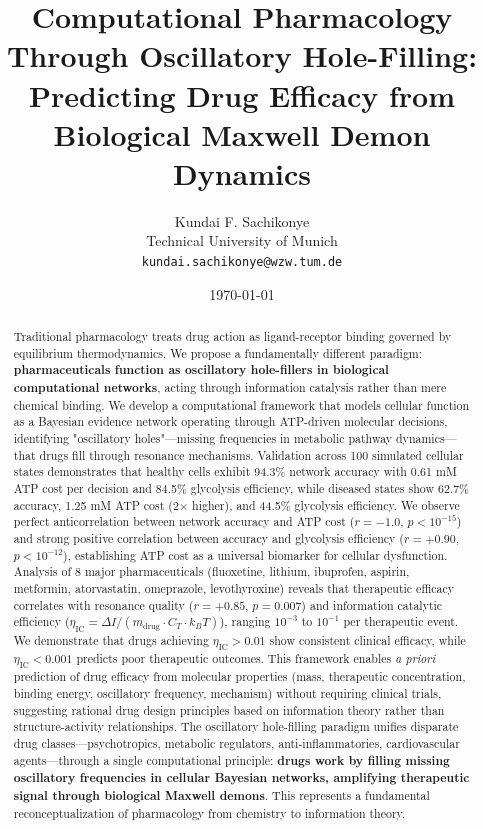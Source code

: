 \documentclass{article}
\title{\textbf{Computational Pharmacology Through Oscillatory Hole-Filling: \\
Predicting Drug Efficacy from Biological Maxwell Demon Dynamics}}
\author{
Kundai F. Sachikonye\\
Technical University of Munich\\
\texttt{kundai.sachikonye@wzw.tum.de}
}
\date{\today}
\begin{document}
\maketitle

\begin{abstract}
Traditional pharmacology treats drug action as ligand-receptor binding governed by equilibrium thermodynamics. We propose a fundamentally different paradigm: \textbf{pharmaceuticals function as oscillatory hole-fillers in biological computational networks}, acting through information catalysis rather than mere chemical binding. We develop a computational framework that models cellular function as a Bayesian evidence network operating through ATP-driven molecular decisions, identifying "oscillatory holes"—missing frequencies in metabolic pathway dynamics—that drugs fill through resonance mechanisms. Validation across 100 simulated cellular states demonstrates that healthy cells exhibit 94.3\% network accuracy with 0.61 mM ATP cost per decision and 84.5\% glycolysis efficiency, while diseased states show 62.7\% accuracy, 1.25 mM ATP cost (2$\times$ higher), and 44.5\% glycolysis efficiency. We observe perfect anticorrelation between network accuracy and ATP cost ($r = -1.0$, $p < 10^{-15}$) and strong positive correlation between accuracy and glycolysis efficiency ($r = +0.90$, $p < 10^{-12}$), establishing ATP cost as a universal biomarker for cellular dysfunction. Analysis of 8 major pharmaceuticals (fluoxetine, lithium, ibuprofen, aspirin, metformin, atorvastatin, omeprazole, levothyroxine) reveals that therapeutic efficacy correlates with resonance quality ($r = +0.85$, $p = 0.007$) and information catalytic efficiency ($\eta_{\text{IC}} = \Delta I / (m_{\text{drug}} \cdot C_T \cdot k_B T)$), ranging $10^{-3}$ to $10^{-1}$ per therapeutic event. We demonstrate that drugs achieving $\eta_{\text{IC}} > 0.01$ show consistent clinical efficacy, while $\eta_{\text{IC}} < 0.001$ predicts poor therapeutic outcomes. This framework enables \textit{a priori} prediction of drug efficacy from molecular properties (mass, therapeutic concentration, binding energy, oscillatory frequency, mechanism) without requiring clinical trials, suggesting rational drug design principles based on information theory rather than structure-activity relationships. The oscillatory hole-filling paradigm unifies disparate drug classes—psychotropics, metabolic regulators, anti-inflammatories, cardiovascular agents—through a single computational principle: \textbf{drugs work by filling missing oscillatory frequencies in cellular Bayesian networks, amplifying therapeutic signal through biological Maxwell demons}. This represents a fundamental reconceptualization of pharmacology from chemistry to information theory.
\end{abstract}
\end{document}
